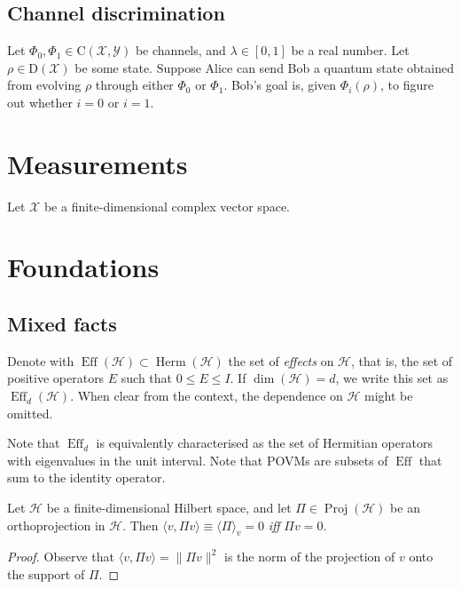 \documentclass[12pt]{report}
\newcommand{\on}[1]{\operatorname{#1}}
\newcommand{\calH}{{\mathcal{H}}}
\newcommand{\calY}{{\mathcal{Y}}}
\newcommand{\calX}{{\mathcal{X}}}
\newcommand{\rmC}{{\mathrm{C}}}
\newcommand{\rmD}{{\mathrm{D}}}
\DeclareMathOperator{\Herm}{Herm}
\DeclareMathOperator{\Proj}{Proj}
\begin{document}
\section{Channel discrimination}

Let $\Phi_0,\Phi_1\in\rmC(\calX,\calY)$ be channels, and $\lambda\in[0,1]$ be a real number. Let $\rho\in\rmD(\calX)$ be some state.
Suppose Alice can send Bob a quantum state obtained from evolving $\rho$ through either $\Phi_0$ or $\Phi_1$.
Bob's goal is, given $\Phi_i(\rho)$, to figure out whether $i=0$ or $i=1$.

\chapter{Measurements}

Let $\calX$ be a finite-dimensional complex vector space.

\chapter{Foundations}

\section{Mixed facts}

\begin{defn}[Effects]
	Denote with $\on{Eff}(\calH)\subset\Herm(\calH)$ the set of \emph{effects} on $\calH$, that is, the set of positive operators $E$ such that $0\le E \le I$. If $\dim(\calH)=d$, we write this set as $\on{Eff}_d(\calH)$. When clear from the context, the dependence on $\calH$ might be omitted.
\end{defn}
Note that $\on{Eff}_d$ is equivalently characterised as the set of Hermitian operators with eigenvalues in the unit interval.
Note that POVMs are subsets of $\on{Eff}$ that sum to the identity operator.

\begin{prop}\label{prop:expval_of_projections_same_as_orthogonal_vec}
	Let $\calH$ be a finite-dimensional Hilbert space, and let $\Pi\in\Proj(\calH)$ be an orthoprojection in $\calH$.
	Then $\langle v,\Pi v\rangle\equiv\langle \Pi\rangle_v=0$ \emph{iff} $\Pi v=0$.
\end{prop}
\begin{proof}
	Observe that $\langle v,\Pi v\rangle=\|\Pi v\|^2$ is the norm of the projection of $v$ onto the support of $\Pi$.
\end{proof}
\end{document}

